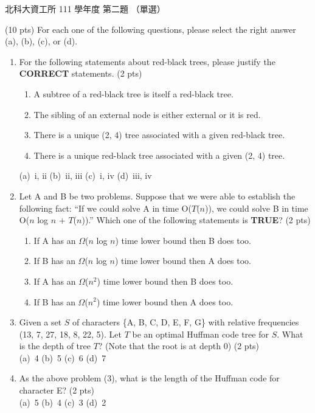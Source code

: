 \begin{pastexam}[label={px:ntut-111-ci-01}]{北科大資工所 111 學年度 第二題}
（單選）

(10 pts) For each one of the following questions, please select the right answer (a), (b), (c), or (d).
\begin{enumerate}[label=(\arabic*)]
\item For the following statements about red-black trees, please justify the \textbf{CORRECT} statements. (2 pts)
\begin{enumerate}[label=\roman*.,nosep]
\item A subtree of a red-black tree is itself a red-black tree.
\item The sibling of an external node is either external or it is red.
\item There is a unique (2, 4) tree associated with a given red-black tree.
\item There is a unique red-black tree associated with a given (2, 4) tree.
\end{enumerate}
(a)~i, ii \qquad (b)~ii, iii \qquad (c)~i, iv \qquad (d)~iii, iv

\item Let A and B be two problems. Suppose that we were able to establish the following fact:
``If we could solve A in time O($T$($n$)), we could solve B in time O($n$ log $n$ + $T$($n$)).''
Which one of the following statements is \textbf{TRUE}? (2 pts)
\begin{enumerate}[label=(\alph*),nosep]
\item If A has an $\Omega$($n$ log $n$) time lower bound then B does too.
\item If B has an $\Omega$($n$ log $n$) time lower bound then A does too.
\item If A has an $\Omega$($n^2$) time lower bound then B does too.
\item If B has an $\Omega$($n^2$) time lower bound then A does too.
\end{enumerate}

\item Given a set $S$ of characters \{A, B, C, D, E, F, G\} with relative frequencies (13, 7, 27, 18, 8, 22, 5). Let $T$ be an optimal Huffman code tree for $S$. What is the depth of tree $T$? (Note that the root is at depth 0) (2 pts)\\
(a)~4 \qquad (b)~5 \qquad (c)~6 \qquad (d)~7

\item As the above problem (3), what is the length of the Huffman code for character E? (2 pts)\\
(a)~5 \qquad (b)~4 \qquad (c)~3 \qquad (d)~2


\end{enumerate}
\end{pastexam}
